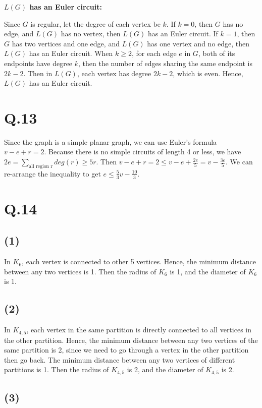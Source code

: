 \documentclass[a4paper,12pt]{article}
\begin{document}
\textbf{$L(G)$ has an Euler circuit:}

Since $G$ is regular, let the degree of each vertex be $k$.
If $k=0$, then $G$ has no edge, and $L(G)$ has no vertex, then $L(G)$ has an Euler circuit.
If $k=1$, then $G$ has two vertices and one edge, and $L(G)$ has one vertex and no edge, then $L(G)$ has an Euler circuit.
When $k \geq 2$, for each edge $e$ in $G$, both of its endpoints have degree $k$, then the number of edges sharing the same endpoint is $2k - 2$.
Then in $L(G)$, each vertex has degree $2k - 2$, which is even.
Hence, $L(G)$ has an Euler circuit.

\section*{Q.13}

Since the graph is a simple planar graph, we can use Euler's formula $v-e+r=2$.
Because there is no simple circuits of length 4 or less, we have $2e  = \sum_{\text{all region r}} deg(r) \geq 5r$.
Then $v-e+r = 2 \leq v - e + \frac{2e}{5} = v - \frac{3e}{5}$.
We can re-arrange the inequality to get $e \leq \frac{5}{3}v - \frac{10}{3}$.

\section*{Q.14}

\subsection*{(1)}

In $K_6$, each vertex is connected to other 5 vertices.
Hence, the minimum distance between any two vertices is 1.
Then the radius of $K_6$ is 1, and the diameter of $K_6$ is 1.

\subsection*{(2)}

In $K_{4,5}$, each vertex in the same partition is directly connected to all vertices in the other partition.
Hence, the minimum distance between any two vertices of the same partition is 2, since we need to go through a vertex in the other partition then go back.
The minimum distance between any two vertices of different partitions is 1.
Then the radius of $K_{4,5}$ is 2, and the diameter of $K_{4,5}$ is 2.

\subsection*{(3)}
\end{document}
